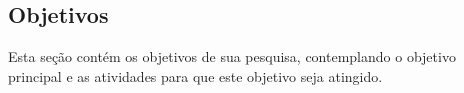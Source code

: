 

\subsection{\textbf{Objetivos}}
    \label{sec:objetivos}
    
    Esta seção contém os objetivos de sua pesquisa, contemplando o objetivo principal e as atividades para que este objetivo seja atingido.
